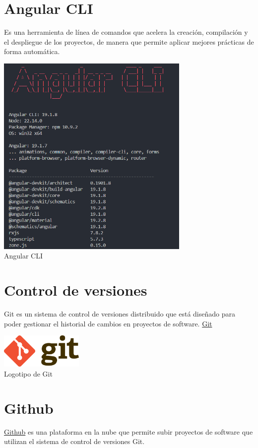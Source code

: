 \section{Angular CLI}\label{angular-cli}
Es una herramienta de línea de comandos que acelera la creación, compilación y el despliegue de los proyectos, de manera que permite aplicar mejores prácticas de forma automática.

\begin{center}
  \includegraphics[width=0.7\textwidth]{img/angular-cli.png}\\
  \small Angular CLI
\end{center}

\section{Control de versiones}\label{control-versiones}
Git es un sistema de control de versiones distribuido que está diseñado para poder gestionar el historial de cambios en proyectos de software.
\href{https://git-scm.com/}{Git}

\begin{center}
  \includegraphics[width=0.3\textwidth]{img/git-logo.png}\\
  \small Logotipo de Git
\end{center}

\section{Github}\label{github}
\href{https://github.com/}{Github} es una plataforma en la nube que permite subir proyectos de software que utilizan el sistema de control de versiones Git. 


